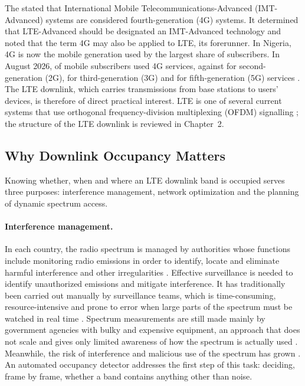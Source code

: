 The \textcite{itu2010} stated that International Mobile Telecommunications-Advanced (IMT-Advanced) systems are considered fourth-generation (4G) systems. It determined that LTE-Advanced should be designated an IMT-Advanced technology and noted that the term 4G may also be applied to LTE, its forerunner. In Nigeria, 4G is now the mobile generation used by the largest share of subscribers. In August 2026,  of mobile subscribers used 4G services, against  for second-generation (2G),  for third-generation (3G) and  for fifth-generation (5G) services \parencite{ncc2026}. The LTE downlink, which carries transmissions from base stations to users' devices, is therefore of direct practical interest. LTE is one of several current systems that use orthogonal frequency-division multiplexing (OFDM) signalling \parencite{axell2010}; the structure of the LTE downlink is reviewed in Chapter~2.

\subsection{Why Downlink Occupancy Matters}
\label{sec:why}

Knowing whether, when and where an LTE downlink band is occupied serves three purposes: interference management, network optimization and the planning of dynamic spectrum access.

\paragraph{Interference management.}
In each country, the radio spectrum is managed by authorities whose functions include monitoring radio emissions in order to identify, locate and eliminate harmful interference and other irregularities \parencite[p.~2]{torio2025}. Effective surveillance is needed to identify unauthorized emissions and mitigate interference. It has traditionally been carried out manually by surveillance teams, which is time-consuming, resource-intensive and prone to error when large parts of the spectrum must be watched in real time \parencite[p.~1]{torio2025}. Spectrum measurements are still made mainly by government agencies with bulky and expensive equipment, an approach that does not scale and gives only limited awareness of how the spectrum is actually used \parencite{calvopalomino2015}. Meanwhile, the risk of interference and malicious use of the spectrum has grown \parencite{tian2022}. An automated occupancy detector addresses the first step of this task: deciding, frame by frame, whether a band contains anything other than noise.

